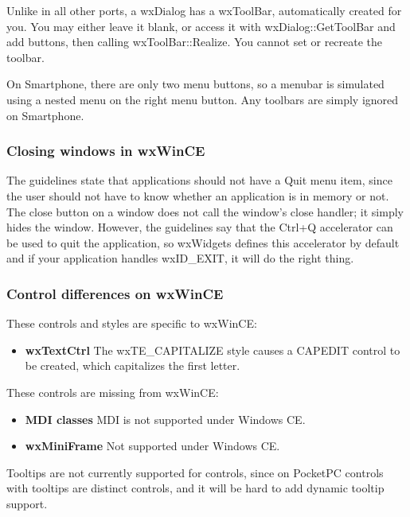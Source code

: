 Unlike in all other ports, a wxDialog has a wxToolBar, automatically created
for you. You may either leave it blank, or access it with wxDialog::GetToolBar
and add buttons, then calling wxToolBar::Realize. You cannot set or recreate
the toolbar.


On Smartphone, there are only two menu buttons, so a menubar is simulated
using a nested menu on the right menu button. Any toolbars are simply ignored on
Smartphone.

\subsubsection{Closing windows in wxWinCE}

The guidelines state that applications should not have a Quit menu item,
since the user should not have to know whether an application is in memory
or not. The close button on a window does not call the window's
close handler; it simply hides the window. However, the guidelines say that
the Ctrl+Q accelerator can be used to quit the application, so wxWidgets
defines this accelerator by default and if your application handles
wxID\_EXIT, it will do the right thing.

\subsubsection{Control differences on wxWinCE}

These controls and styles are specific to wxWinCE:

\itemsep=0pt
\begin{itemize}
\item {\bf wxTextCtrl} The wxTE\_CAPITALIZE style causes a CAPEDIT control to
be created, which capitalizes the first letter.
\end{itemize}

These controls are missing from wxWinCE:

\itemsep=0pt
\begin{itemize}
\item {\bf MDI classes} MDI is not supported under Windows CE.
\item {\bf wxMiniFrame} Not supported under Windows CE.
\end{itemize}

Tooltips are not currently supported for controls, since on PocketPC controls with
tooltips are distinct controls, and it will be hard to add dynamic
tooltip support.

